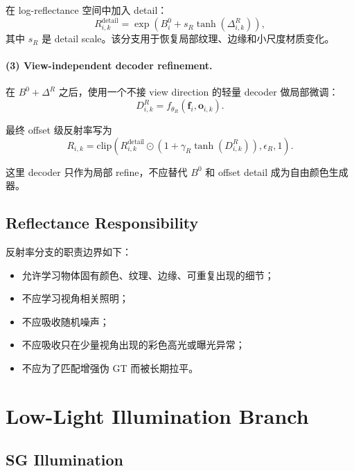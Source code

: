\documentclass[11pt]{article}
\begin{document}
在 log-reflectance 空间中加入 detail：
\begin{equation}
    R_{i,k}^{\text{detail}}
    =
    \exp\left(
        B_i^0 + s_R \tanh(\Delta^R_{i,k})
    \right),
\end{equation}
其中 $s_R$ 是 detail scale。该分支用于恢复局部纹理、边缘和小尺度材质变化。

\paragraph{(3) View-independent decoder refinement.}
在 $B^0 + \Delta^R$ 之后，使用一个不接 view direction 的轻量 decoder 做局部微调：
\begin{equation}
    D^R_{i,k}
    =
    f_{\theta_R}\left(\mathbf{f}_i, \mathbf{o}_{i,k}\right).
\end{equation}

最终 offset 级反射率写为
\begin{equation}
    R_{i,k}
    =
    \mathrm{clip}
    \left(
        R_{i,k}^{\text{detail}}
        \odot
        \left(1 + \gamma_R \tanh(D^R_{i,k})\right),
        \epsilon_R,
        1
    \right).
\end{equation}

这里 decoder 只作为局部 refine，不应替代 $B^0$ 和 offset detail 成为自由颜色生成器。

\subsection{Reflectance Responsibility}

反射率分支的职责边界如下：
\begin{itemize}[leftmargin=1.5em]
    \item 允许学习物体固有颜色、纹理、边缘、可重复出现的细节；
    \item 不应学习视角相关照明；
    \item 不应吸收随机噪声；
    \item 不应吸收只在少量视角出现的彩色高光或曝光异常；
    \item 不应为了匹配增强伪 GT 而被长期拉平。
\end{itemize}

\section{Low-Light Illumination Branch}

\subsection{SG Illumination}
\end{document}
